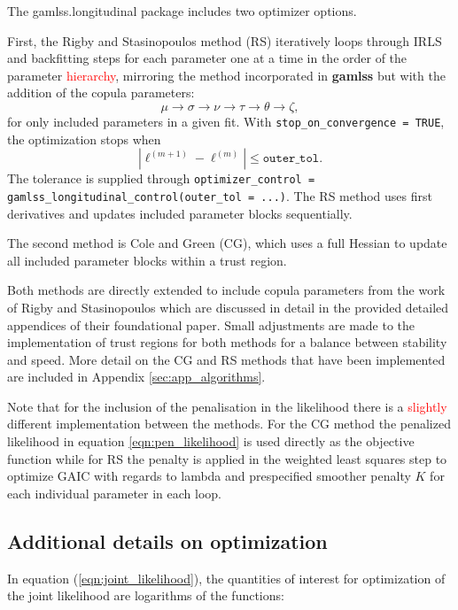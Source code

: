 \documentclass{article}
\newcommand{\pkg}{\textbf}
\newcommand{\jsschange}[1]{\textcolor{red}{#1}}
\begin{document}
The gamlss.longitudinal package includes two optimizer options. 

First, the Rigby and Stasinopoulos method (RS)\citep{Rigby2005} iteratively loops through IRLS and backfitting steps for each parameter one at a time in the order of the parameter \jsschange{hierarchy}, mirroring the method incorporated in \pkg{gamlss} but with the addition of the copula parameters: \begin{equation*}
\mu \rightarrow \sigma \rightarrow \nu \rightarrow \tau \rightarrow \theta \rightarrow \zeta,
\end{equation*} for only included parameters in a given fit. With \texttt{stop\_on\_convergence = TRUE}, the optimization stops when \begin{equation*}
\left|\ell^{(m+1)} - \ell^{(m)}\right| \le \texttt{outer\_tol}.
\end{equation*}
The tolerance is supplied through \texttt{optimizer\_control = gamlss\_longitudinal\_control(outer\_tol = ...)}.
The RS method uses first derivatives and updates included parameter blocks sequentially.

The second method is Cole and Green (CG)\cite{cole_smoothing_1992}, which uses a full Hessian to update all included parameter blocks within a trust region.

Both methods are directly extended to include copula parameters from the work of Rigby and Stasinopoulos which are discussed in detail in the provided detailed appendices of their foundational paper\cite{Rigby2005}. Small adjustments are made to the implementation of trust regions for both methods for a balance between stability and speed. More detail on the CG and RS methods that have been implemented are included in Appendix \ref{sec:app_algorithms}.

Note that for the inclusion of the penalisation in the likelihood there is a \jsschange{slightly} different implementation between the methods. For the CG method the penalized likelihood in equation \ref{eqn:pen_likelihood} is used directly as the objective function while for RS the penalty is applied in the weighted least squares step to optimize GAIC with regards to lambda and prespecified smoother penalty $K$ for each individual parameter in each loop.

\subsection{Additional details on optimization}

In equation (\ref{eqn:joint_likelihood}), the quantities of interest for optimization of the joint likelihood are logarithms of the functions:
\end{document}
